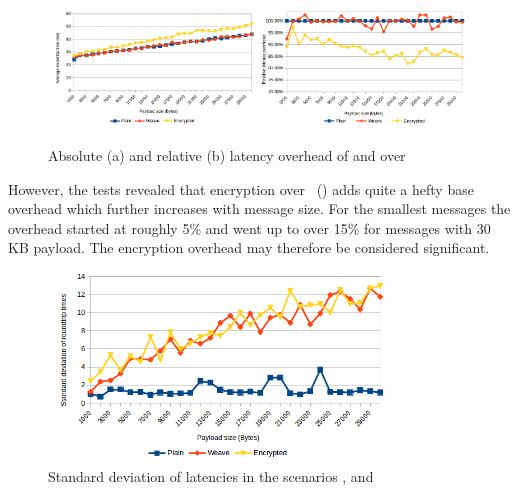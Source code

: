 \begin{figure}[htpb]
  \centering
  \includegraphics[width=0.49\textwidth]{figures/latency-absolute}
  \includegraphics[width=0.49\textwidth]{figures/latency-relative}
  \caption[Latency overhead]{Absolute (a) and relative (b) latency overhead of  and  over }\label{fig:latency-relative}
\end{figure}

However, the tests revealed that encryption over \wnet\ () adds quite a hefty base overhead which further increases with message size. For the smallest messages the overhead started at roughly 5\% and went up to over 15\% for messages with 30 KB payload. The encryption overhead may therefore be considered significant.

\begin{figure}[htpb]
  \centering
  \includegraphics[width=0.8\textwidth]{figures/latency-stdev}
  \caption[Latency deviation]{Standard deviation of latencies in the scenarios ,  and }\label{fig:latency-stdev}
\end{figure}

